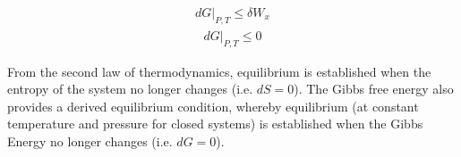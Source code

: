 \begin{align} 
    dG|_{P,T} \leq \delta W_x \label{eq:dG_def_PT_reduced2}
\end{align}
\begin{align} 
    dG|_{P,T} \leq 0 \label{eq:dG_def_PT_reduced3}
\end{align}

From the second law of thermodynamics, equilibrium is established when the entropy of the system no longer changes (i.e. \(dS = 0\)). The Gibbs free energy also provides a derived equilibrium condition, whereby equilibrium (at constant temperature and pressure for closed systems) is established when the Gibbs Energy no longer changes (i.e. \(dG = 0\)).
